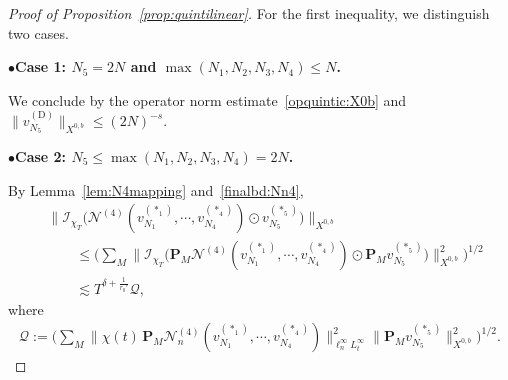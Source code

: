 \documentclass[11pt,reqno,english]{amsart}
\numberwithin{equation}{section}
\theoremstyle{plain}
\theoremstyle{definition}
\theoremstyle{remark}
\newcommand{\noi}{\noindent}
\newcommand{\dotcirc}{\mathbin{\odot}}
\begin{document}
\begin{proof}[Proof of Proposition~\ref{prop:quintilinear}]
For the first inequality, we distinguish two cases.

\noi
$\bullet${\bf Case 1: $N_5=2N$ and $\max(N_1,N_2,N_3,N_4)\leq N$.}

We conclude by the operator norm estimate~\eqref{opquintic:X0b} and $\|v_{N_5}^{(\mathrm{D})}\|_{X^{0,b}}\leq (2N)^{-s}$.

\medskip

\noi
$\bullet${\bf Case 2: $N_5 \leq \max(N_1,N_2,N_3,N_4)=2N$.}

By Lemma~\ref{lem:N4mapping} and~\eqref{finalbd:Nn4},
\begin{align*}
	&\big\|
	\mathcal{I}_{\chi_T}\big(\mathcal{N}^{(4)}(v_{N_1}^{(\ast_1)},\cdots, v_{N_4}^{(\ast_4)})\dotcirc v_{N_5}^{(\ast_5)}\big)
	\big\|_{X^{0,b}}\\ &\qquad\leq
	\Big(\sum_{M}
	\big\|\mathcal{I}_{\chi_T}\big(\mathbf{P}_{M}\mathcal{N}^{(4)}(v_{N_1}^{(\ast_1)},\cdots, v_{N_4}^{(\ast_4)})\dotcirc \mathbf{P}_{M}v_{N_5}^{(\ast_5)}\big)
	\big\|_{X^{0,b}}^2
	\Big)^{1/2}\\
	&\qquad\lesssim T^{\delta+\frac{1}{r_0'}}\mathcal{Q},
\end{align*}
where
\begin{align}\label{eq:Q}
	\mathcal{Q}:=\Big(
	\sum_{M}\|\chi(t)\,\mathbf{P}_M\mathcal{N}_n^{(4)}(v_{N_1}^{(\ast_1)},\cdots, v_{N_4}^{(\ast_4)})\|_{\ell_n^{\infty}L_t^{\infty}}^2 \|\mathbf{P}_M v_{N_5}^{(\ast_5)}\|_{X^{0,b}}^2
	\Big)^{1/2}.
\end{align}



\end{proof}
\end{document}
